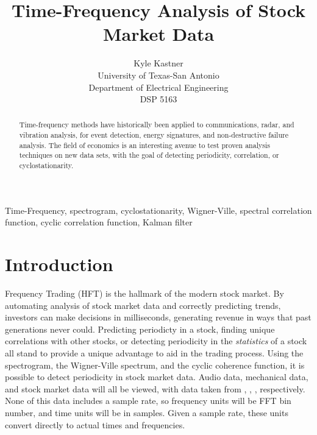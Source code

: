 \documentclass[journal]{IEEEtran}
\begin{document}
\title{Time-Frequency Analysis of Stock Market Data}

\author{Kyle Kastner\\University of Texas-San Antonio\\Department of Electrical Engineering\\DSP 5163}

\maketitle

\begin{abstract}
Time-frequency methods have historically been applied to communications, radar, and vibration analysis, for event detection, energy signatures, 
and non-destructive failure analysis. The field of economics is an interesting avenue to test proven analysis techniques on new data sets, with the 
goal of detecting periodicity, correlation, or cyclostationarity.
\end{abstract}

\begin{IEEEkeywords}
Time-Frequency, spectrogram, cyclostationarity, Wigner-Ville, spectral correlation function, cyclic correlation function, Kalman filter 
\end{IEEEkeywords}

\IEEEpeerreviewmaketitle
\section{Introduction}
 Frequency Trading (HFT) is the hallmark of the modern stock market. By automating analysis of stock market data and correctly 
predicting trends, investors can make decisions in milliseconds, generating revenue in ways that past generations never could. Predicting periodicty in 
a stock, finding unique correlations with other stocks, or detecting periodicity in the \emph{statistics} of a stock all stand to provide a unique
advantage to aid in the trading process. Using the spectrogram, the Wigner-Ville spectrum, and the cyclic coherence function, it 
is possible to detect periodicity in stock market data. Audio data, mechanical data, and stock market data will all be viewed, with data
taken from \cite{SignalData}, \cite{CyclicData}, \cite{StockData}, respectively. None of this data includes a sample rate, so frequency units will be FFT
bin number, and time units will be in samples. Given a sample rate, these units convert directly to actual times and frequencies.  
\end{document}

